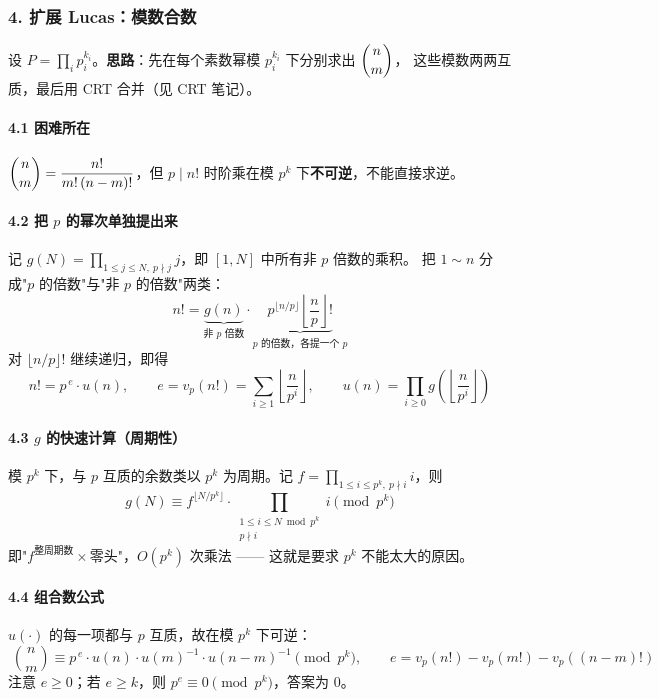 \hrulefill

\subsubsection*{4. 扩展 Lucas：模数合数}

设 $P = \prod_{i} p_i^{k_i}$。\textbf{思路}：先在每个素数幂模 $p_i^{k_i}$ 下分别求出 $\dbinom{n}{m}$，
这些模数两两互质，最后用 CRT 合并（见 CRT 笔记）。

\paragraph{4.1 困难所在}
$\dbinom{n}{m} = \dfrac{n!}{m!\,(n-m)!}$，但 $p \mid n!$ 时阶乘在模 $p^k$ 下\textbf{不可逆}，不能直接求逆。

\paragraph{4.2 把 $p$ 的幂次单独提出来}
记 $g(N) = \prod_{1 \le j \le N,\ p \nmid j} j$，即 $[1,N]$ 中所有非 $p$ 倍数的乘积。
把 $1 \sim n$ 分成"$p$ 的倍数"与"非 $p$ 的倍数"两类：
$$n! = \underbrace{g(n)}_{\text{非 } p \text{ 倍数}} \cdot \underbrace{p^{\lfloor n/p \rfloor}\left\lfloor \frac{n}{p} \right\rfloor !}_{p \text{ 的倍数，各提一个 } p}$$
对 $\lfloor n/p \rfloor !$ 继续递归，即得
$$n! = p^{\,e}\cdot u(n), \qquad e = v_p(n!) = \sum_{i \ge 1}\left\lfloor \frac{n}{p^i} \right\rfloor, \qquad u(n) = \prod_{i \ge 0} g\!\left(\left\lfloor \frac{n}{p^i} \right\rfloor\right)$$

\paragraph{4.3 $g$ 的快速计算（周期性）}
模 $p^k$ 下，与 $p$ 互质的余数类以 $p^k$ 为周期。记 $f = \prod_{1 \le i \le p^k,\ p \nmid i} i$，则
$$g(N) \equiv f^{\lfloor N/p^k \rfloor}\cdot \prod_{\substack{1 \le i \le N \bmod p^k \\ p \nmid i}} i \pmod{p^k}$$
即"$f^{\text{整周期数}} \times \text{零头}$"，$O(p^k)$ 次乘法 —— 这就是要求 $p^k$ 不能太大的原因。

\paragraph{4.4 组合数公式}
$u(\cdot)$ 的每一项都与 $p$ 互质，故在模 $p^k$ 下可逆：
$$\boxed{\;\binom{n}{m} \equiv p^{\,e}\cdot u(n)\cdot u(m)^{-1}\cdot u(n-m)^{-1} \pmod{p^k},\qquad
e = v_p(n!) - v_p(m!) - v_p((n-m)!)\;}$$
注意 $e \ge 0$；若 $e \ge k$，则 $p^e \equiv 0 \pmod{p^k}$，答案为 $0$。

